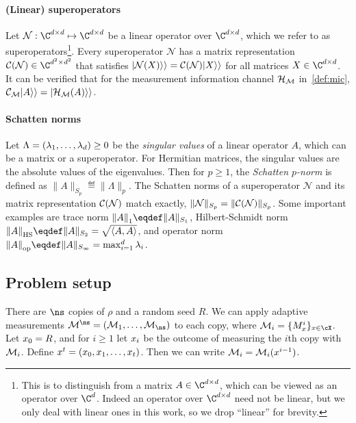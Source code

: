 \paragraph{(Linear) superoperators} Let $\mathcal{N}:\C^{\dims\times \dims}\mapsto \C^{\dims\times \dims}$ be a linear operator over $\C^{\dims\times \dims}$, which we refer to as superoperators\footnote{This is to distinguish from a matrix $A\in\C^{\dims\times \dims}$, which can be viewed as an operator over $\C^\dims$. Indeed an operator over $\C^{\dims\times \dims}$ need not be linear, but we only deal with linear ones in this work, so we drop ``linear'' for brevity.}. Every superoperator $\mathcal{N}$ has a matrix representation $\Choi(\mathcal{N})\in \C^{\dims^2\times\dims^2}$ that satisfies $|\mathcal{N}(X)\rangle\rangle={\mathcal{C}}(\mathcal{N})|X\rangle\rangle$ for all matrices $X\in\C^{\dims\times\dims}$. It can be verified that for the measurement information channel $\mathcal{H}_{\mathcal{M}}$ in~\cref{def:mic}, ${\mathcal{C}}_{\mathcal{M}}|A\rangle\rangle=|\mathcal{H}_{\mathcal{M}}(A)\rangle\rangle$.


\paragraph{Schatten norms} Let $\Lambda=(\lambda_1, \ldots, \lambda_d)\ge 0$ be the \emph{singular values} of a linear operator $A$, which can be a matrix or a superoperator. {For Hermitian matrices, the singular values are the absolute values of the eigenvalues.} Then for $p\ge 1$, the \emph{Schatten $p$-norm} is defined as 
$
\|A\|_{S_p}\eqdef \|\Lambda\|_p
$. The Schatten norms of a superoperator $\mathcal{N}$ and its matrix representation ${\mathcal{C}}(\mathcal{N})$ match exactly, $\|\mathcal{N}\|_{S_p}=\|{\mathcal{C}}(\mathcal{N})\|_{S_p}$. Some important examples are trace norm $\tracenorm{A}\eqdef\|A\|_{S_1}$, Hilbert-Schmidt norm $\hsnorm{A}\eqdef\|A\|_{S_2}=\sqrt{\hdotprod{A}{A}}$, and operator norm $\opnorm{A}\eqdef\|A\|_{S_\infty}=\max_{i=1}^\dims\lambda_i$. 



\subsection{Problem setup}
There are $\ns$ copies of $\rho$ and a random seed $R$. We can apply adaptive measurements $\POVM^\ns = (\POVM_1, \ldots, \POVM_\ns)$ to each copy, where $\POVM_i=\{M_x^i\}_{x\in\cX}$. Let ${x}_0=R$, and for $i\ge 1$ let ${x}_i$ be the outcome of measuring the $i$th copy with $\mathcal{M}_i$. Define ${x}^t=({x}_0,{x}_1, \ldots, {x}_t)$. Then we can write $\mathcal{M}_i=\mathcal{M}_i({x}^{i-1})$.

